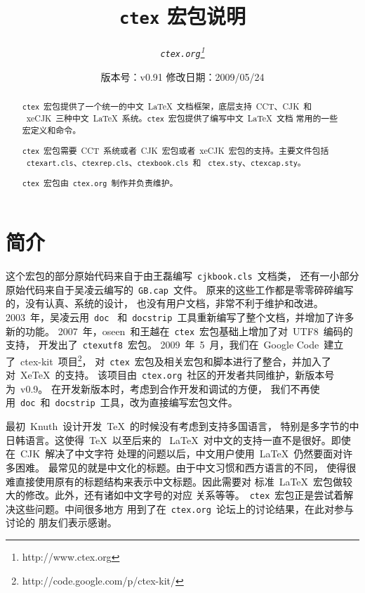 \documentclass{ltxdoc}
\newcommand{\ctex}{\texttt{ctex}}
\newcommand{\ctexorg}{\texttt{ctex.org}}
\begin{document}
\title{\bf \ctex{} 宏包说明}
\author{\it \ctexorg\thanks{http://www.ctex.org}}
\date{\small 版本号：v0.91 \ccwd 修改日期：2009/05/24}
\maketitle


\begin{abstract}
\ctex{}~宏包提供了一个统一的中文~\LaTeX{}~文档框架，底层支持~CCT、CJK~和
~xeCJK~三种中文~\LaTeX{}~系统。\ctex{}~宏包提供了编写中文~\LaTeX{}~文档
常用的一些宏定义和命令。

\ctex{}~宏包需要~CCT~系统或者~CJK~宏包或者~xeCJK~宏包的支持。主要文件包括
~\texttt{ctexart.cls}、\texttt{ctexrep.cls}、\texttt{ctexbook.cls}~和
~\texttt{ctex.sty}、\texttt{ctexcap.sty}。

\ctex{}~宏包由~\ctexorg{}~制作并负责维护。
\end{abstract}

\tableofcontents

\section{简介}

这个宏包的部分原始代码来自于由王磊编写~\texttt{cjkbook.cls}~文档类，
还有一小部分原始代码来自于吴凌云编写的~\texttt{GB.cap}~文件。
原来的这些工作都是零零碎碎编写的，没有认真、系统的设计，
也没有用户文档，非常不利于维护和改进。2003~年，吴凌云用~\texttt{doc}~
和~\texttt{docstrip}~工具重新编写了整个文档，并增加了许多新的功能。
2007~年，oseen~和王越在~\ctex{}~宏包基础上增加了对~UTF8~编码的支持，
开发出了~\texttt{ctexutf8}~宏包。
2009~年~5~月，我们在~Google Code~建立了~ctex-kit~项目\footnote{http://code.google.com/p/ctex-kit/}，
对~\ctex{}~宏包及相关宏包和脚本进行了整合，并加入了对~Xe\TeX{}~的支持。
该项目由~\ctexorg{}~社区的开发者共同维护，新版本号为~v0.9。
在开发新版本时，考虑到合作开发和调试的方便，
我们不再使用~\texttt{doc}~和~\texttt{docstrip}~工具，改为直接编写宏包文件。

最初~Knuth~设计开发~\TeX{}~的时候没有考虑到支持多国语言，
特别是多字节的中日韩语言。这使得~\TeX{}~以至后来的
~\LaTeX{}~对中文的支持一直不是很好。即使在~CJK~解决了中文字符
处理的问题以后，中文用户使用~\LaTeX{}~仍然要面对许多困难。
最常见的就是中文化的标题。由于中文习惯和西方语言的不同，
使得很难直接使用原有的标题结构来表示中文标题。因此需要对
标准~\LaTeX{}~宏包做较大的修改。此外，还有诸如中文字号的对应
关系等等。~\ctex{}~宏包正是尝试着解决这些问题。中间很多地方
用到了在~\ctexorg{}~论坛上的讨论结果，在此对参与讨论的
朋友们表示感谢。
\end{document}
